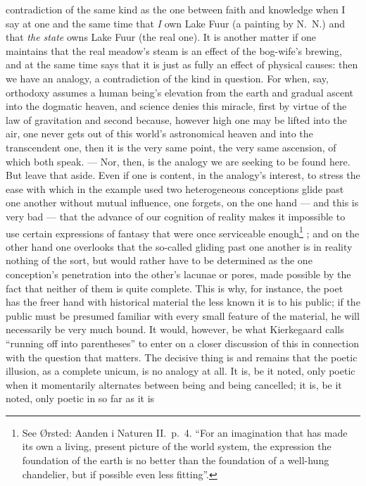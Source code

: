 \documentclass[12pt,a4paper]{book}
\renewcommand{\thefootnote}{*)}
\newcommand{\fnmark}[2]{\renewcommand{\thefootnote}{#1}\footnote{#2}%
  \renewcommand{\thefootnote}{*)}}
\newcommand{\opage}[1]{\marginnote{\footnotesize\textit{[#1]}}}
\begin{document}
contradiction of the same kind as the one between faith and knowledge when I
say at one and the same time that \emph{I} own Lake Fuur (a painting by N.\
N.) and that \emph{the state} owns Lake Fuur (the real one). It is another
matter if one maintains that the real meadow's steam is an effect of the
bog-wife's brewing, and at the same time says that it is just as fully an
effect of physical causes: then we have an analogy, a contradiction of the kind
in question. For when, say, orthodoxy assumes a human being's elevation from
the earth and gradual ascent into the dogmatic heaven, and science denies this
miracle, first by virtue of the law of gravitation and second because, however
high one may be lifted into
\opage{42}the air, one never gets out of this world's astronomical heaven and
into the transcendent one, then it is the very same point, the very same
ascension, of which both speak. --- Nor, then, is the analogy we are seeking to
be found here. But leave that aside. Even if one is content, in the analogy's
interest, to stress the ease with which in the example used two heterogeneous
conceptions glide past one another without mutual influence, one forgets, on
the one hand --- and this is very bad --- that the advance of our cognition of
reality makes it impossible to use certain expressions of fantasy that were
once serviceable enough\fnmark{*)}{See Ørsted: Aanden i Naturen II.\ p.\ 4.
``For an imagination that has made its own a living, present picture of the
world system, the expression the foundation of the earth is no better
than the foundation of a well-hung chandelier, but if possible even less
fitting''.}; and on the other hand one overlooks that the so-called gliding
past one another is in reality nothing of the sort, but would rather have to be
determined as the one conception's penetration into the other's lacunae or
pores, made possible by the fact that neither of them is quite complete. This
is why, for instance, the poet has the freer hand with historical material the
less known it is to his public; if the public must be presumed familiar with
every small feature of the material, he will necessarily be very much bound. It
would, however, be what Kierkegaard calls ``running off into parentheses'' to
enter on a closer discussion of this in
\opage{43}connection with the question that matters. The decisive thing is and
remains that the poetic illusion, as a complete unicum, is no analogy at all.
It is, be it noted, only poetic when it momentarily alternates between being
and being cancelled; it is, be it noted, only poetic in so far as it is
\end{document}
